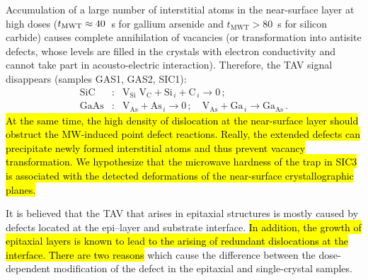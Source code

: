 \documentclass[10pt]{iopart}
\begin{document}
Accumulation of a large number of interstitial atoms in the near-surface layer at high doses
($t_{\rm MWT}\approx40$~s for gallium arsenide and $t_\mathrm{MWT}>80$~s for silicon carbide)
causes complete annihilation of vacancies (or transformation into antisite defects, whose levels are filled in the crystals with electron conductivity and cannot take part in acousto-electric interaction).
Therefore, the TAV signal disappears (samples GAS1, GAS2, SIC1):
\begin{eqnarray}
  \nonumber
  \mathrm{SiC}&:&\mathrm{V}_\mathrm{Si}\;\mathrm{V}_\mathrm{C}+\mathrm{Si}_{\,i}+ \mathrm{C}_{\,i} \rightarrow 0\,;\\
  \nonumber
  \mathrm{GaAs}&:&\mathrm{V}_\mathrm{As}+\mathrm{As}_{\,i} \rightarrow 0\,;\quad
  \mathrm{V}_\mathrm{As}+\mathrm{Ga}_{\,i} \rightarrow \mathrm{Ga}_\mathrm{As}\,.
\end{eqnarray}
\hl{At the same time, the high density of dislocation at the near-surface
layer should obstruct the MW-induced point defect reactions.
Really, the extended defects can precipitate newly formed interstitial atoms and thus prevent vacancy transformation.
We hypothesize that the microwave hardness of the trap in SIC3 is associated
with the detected deformations of the near-surface crystallographic planes.}


It is believed \cite{OstrovskiiSST,OlikhSSC,OstrovPAN} that the TAV
that arises in epitaxial structures
is mostly caused by defects located at the epi--layer and substrate interface.
\hl{In addition, the growth of epitaxial layers is known to lead to
the arising of redundant dislocations at the interface.
There are two reasons }which cause the difference between the dose-dependent modification
of the defect in the epitaxial and single-crystal samples.
\end{document}
